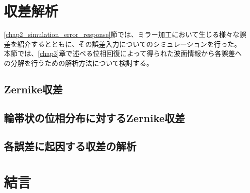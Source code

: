 \clearpage
\newpage
\section{収差解析}
\label{chap2_simulation_zernike_analysis}

\ref{chap2_simulation_error_response}節では、ミラー加工において生じる様々な誤差を紹介するとともに、その誤差入力についてのシミュレーションを行った。
本節では、\ref{chap3}章で述べる位相回復によって得られた波面情報から各誤差への分解を行うための解析方法について検討する。

\subsection{Zernike収差}

\subsection{輪帯状の位相分布に対するZernike収差}


\subsection{各誤差に起因する収差の解析}



\section{結言}
\label{chap2_conclusion}



